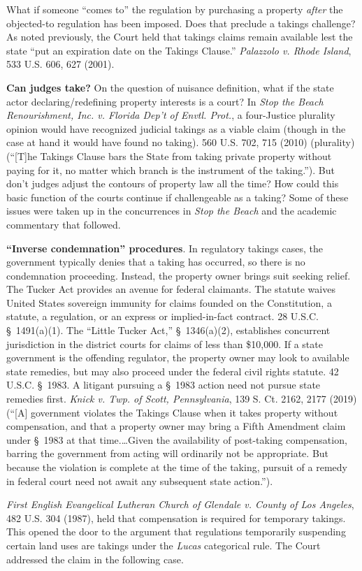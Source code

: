 \item What if someone ``comes to'' the regulation by purchasing a property
\textit{after} the objected-to regulation has been imposed. Does that preclude a
takings challenge? As noted previously, the Court held that takings claims
remain available lest the state ``put an expiration date on the Takings
Clause.'' \textit{Palazzolo v. Rhode Island}, 533 U.S. 606, 627 (2001).

\item \textbf{Can judges take?} On the question of nuisance definition, what if
the state actor declaring/redefining property interests is a court? In
\textit{Stop the Beach Renourishment, Inc. v. Florida Dep't of Envtl. Prot.}, a
four-Justice plurality opinion would have recognized judicial takings as a
viable claim (though in the case at hand it would have found no taking). 560
U.S. 702, 715 (2010) (plurality) (``[T]he Takings Clause bars the State from
taking private property without paying for it, no matter which branch is the
instrument of the taking.''). But don't judges adjust the contours of property
law all the time? How could this basic function of the courts continue if
challengeable as a taking? Some of these issues were taken up in the
concurrences in \textit{Stop the Beach} and the academic commentary that
followed.

\item \textbf{``Inverse condemnation'' procedures}. In regulatory takings
cases, the government typically denies that a taking has occurred, so there is
no condemnation proceeding. Instead, the property owner brings suit seeking
relief. The Tucker Act provides an avenue for federal claimants. The statute
waives United States sovereign immunity for claims founded on the Constitution,
a statute, a regulation, or an express or implied-in-fact contract. 28 U.S.C.
\S~1491(a)(1). The ``Little Tucker Act,'' \S~1346(a)(2), establishes concurrent
jurisdiction in the district courts for claims of less than \$10,000. If a state
government is the offending regulator, the property owner may look to available
state remedies, but may also proceed under the federal civil rights statute. 42
U.S.C. \S~1983. A litigant pursuing a \S~1983 action need not pursue state
remedies first. \emph{Knick v. Twp. of Scott, Pennsylvania}, 139 S. Ct. 2162,
2177 (2019) (``[A] government violates the Takings Clause when it takes property
without compensation, and that a property owner may bring a Fifth Amendment
claim under \S~1983 at that time.\ldots Given the availability of post-taking
compensation, barring the government from acting will ordinarily not be
appropriate. But because the violation is complete at the time of the taking,
pursuit of a remedy in federal court need not await any subsequent state
action.'').

\item \textit{First English Evangelical Lutheran Church of Glendale v. County of
Los Angeles}, 482 U.S. 304 (1987), held that compensation is required for
temporary takings. This opened the door to the argument that regulations
temporarily suspending certain land uses are takings under the \textit{Lucas}
categorical rule. The Court addressed the claim in the following case.

